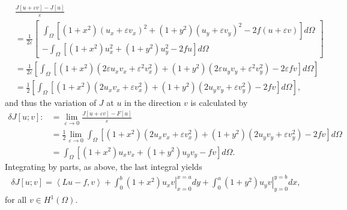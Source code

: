 \documentclass[11pt,a4paper]{article}
\numberwithin{equation}{section}
\numberwithin{equation}{section}
\begin{document}
\begin{enumerate}
\begin{align}
& \frac{{J\left[ {u + \varepsilon v} \right] - J\left[ u \right]}}{\varepsilon } \\
&= \frac{1}{{2\varepsilon }}\left[ \begin{array}{l}
\int_\Omega  {\left[ {\left( {1 + {x^2}} \right){{\left( {{u_x} + \varepsilon {v_x}} \right)}^2} + \left( {1 + {y^2}} \right){{\left( {{u_y} + \varepsilon {v_y}} \right)}^2} - 2f\left( {u + \varepsilon v} \right)} \right]d\Omega } \\
 - \int_\Omega  {\left[ {\left( {1 + {x^2}} \right)u_x^2 + \left( {1 + {y^2}} \right)u_y^2 - 2fu} \right]d\Omega } 
\end{array} \right]\\
& = \frac{1}{{2\varepsilon }}\left[ {\int_\Omega  {\left[ {\left( {1 + {x^2}} \right)\left( {2\varepsilon {u_x}{v_x} + {\varepsilon ^2}v_x^2} \right) + \left( {1 + {y^2}} \right)\left( {2\varepsilon {u_y}{v_y} + {\varepsilon ^2}v_y^2} \right) - 2\varepsilon fv} \right]d\Omega } } \right]\\
& = \frac{1}{2}\left[ {\int_\Omega  {\left[ {\left( {1 + {x^2}} \right)\left( {2{u_x}{v_x} + \varepsilon v_x^2} \right) + \left( {1 + {y^2}} \right)\left( {2{u_y}{v_y} + \varepsilon v_y^2} \right) - 2fv} \right]d\Omega } } \right],
\end{align}
and thus the variation of $J$ at $u$ in the direction $v$ is calculated by
\begin{align}
\delta J\left[ {u;v} \right]: &= \mathop {\lim }\limits_{\varepsilon  \to 0} \frac{{J\left[ {u + \varepsilon v} \right] - F\left[ u \right]}}{\varepsilon }\\
& = \frac{1}{2}\mathop {\lim }\limits_{\varepsilon  \to 0} \int_\Omega  {\left[ {\left( {1 + {x^2}} \right)\left( {2{u_x}{v_x} + \varepsilon v_x^2} \right) + \left( {1 + {y^2}} \right)\left( {2{u_y}{v_y} + \varepsilon v_y^2} \right) - 2fv} \right]d\Omega } \\
& = \int_\Omega  {\left[ {\left( {1 + {x^2}} \right){u_x}{v_x} + \left( {1 + {y^2}} \right){u_y}{v_y} - fv} \right]d\Omega } .
\end{align}
Integrating by parts, as above, the last integral yields
\begin{align}
\delta J\left[ {u;v} \right] = \left\langle {Lu - f,v} \right\rangle  + \int_0^b {\left. {\left( {1 + {x^2}} \right){u_x}v} \right|_{x = 0}^{x = a}dy}  + \int_0^a {\left. {\left( {1 + {y^2}} \right){u_y}v} \right|_{y = 0}^{y = b}dx} ,
\end{align}
for all $v\in H^1\left(\Omega\right)$. 


\end{enumerate}
\end{document}
